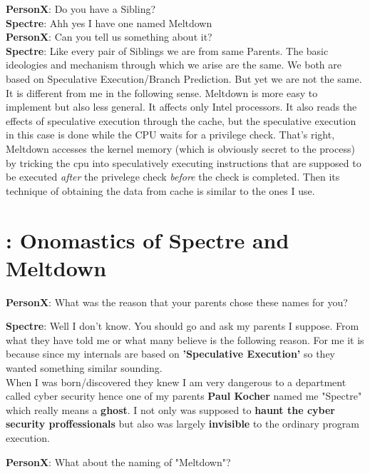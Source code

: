 \documentclass[12pt]{article}
\begin{document}
\begin{appendices}
	\textbf{PersonX}: Do you have a Sibling?\\
	
	\textbf{Spectre}: Ahh yes I have one named Meltdown\\
	
	\textbf{PersonX}: Can you tell us something about it?\\
	
	\textbf{Spectre}: Like every pair of Siblings we are from same Parents. The basic ideologies and mechanism through which we arise are the same. We both are based on Speculative Execution/Branch Prediction. But yet we are not the same. It is different from me in the following sense. Meltdown is more easy to implement but also less general. It affects only Intel processors. It also reads the effects of speculative execution through the cache, but the speculative execution in this case is done while the CPU waits for a privilege check. 
	That's right, Meltdown accesses the kernel memory (which is obviously secret to the process) by tricking the cpu into speculatively executing instructions that are supposed to be executed \textit{after} the privelege check \textit{before} the check is completed. Then its technique of obtaining the data from cache is similar to the ones I use. 
	
	\section{:  Onomastics of Spectre and Meltdown \cite{NameOrigin}}
	\textbf{PersonX}: What was the reason that your parents chose these names for you?
	
	\textbf{Spectre}: Well I don't know. You should go and ask my parents I suppose. From what they have told me or what many believe is the following reason. For me it is because since my internals are based on \textbf{'Speculative Execution'}  so they wanted something similar sounding.\\ When I was born/discovered they knew I am very dangerous to a department called cyber security hence one of my parents \textbf{Paul Kocher} named me "Spectre" which really means a \textbf{ghost}. I not only was supposed to \textbf{haunt the cyber security proffessionals} but also was largely \textbf{invisible} to the ordinary program execution.
	
	\textbf{PersonX}: What about the naming of "Meltdown"?
	

\end{appendices}
\end{document}
